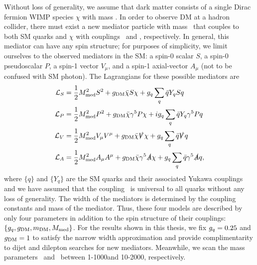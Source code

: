 Without loss of generality, we assume that dark matter consists of a single Dirac fermion WIMP species $\chi$ with mass \mdm. 
In order to observe DM at a hadron collider, there must exist a new mediator particle with mass \mmed\ that couples to both SM quarks and $\chi$ with couplings \gq\ and \gdm, respectively.
In general, this mediator can have any spin structure; for purposes of simplicity, we limit ourselves to the observed mediators in the SM: a spin-0 scalar $S$, a spin-0 pseudoscalar $P$, a spin-1 vector $V_\mu$, and a spin-1 axial-vector $A_\mu$ (not to be confused with SM photon). %
The Lagrangians for these possible mediators are
\begin{align}
  \mathcal{L}_{S} & = \frac{1}{2} M_{\text{med}}^2 S^2 + g_{\text{DM}} \bar \chi S \chi + g_{{q}} \sum\limits_q \bar q Y_q S q \\
  \mathcal{L}_{P} & = \frac{1}{2} M_{\text{med}}^2 P^2 + g_{\text{DM}} \bar \chi \gamma^5 P \chi + i g_{{q}} \sum\limits_q \bar q Y_q \gamma^5 P q \\
  \mathcal{L}_{V} & = \frac{1}{2} M_{\text{med}}^2 V_\mu V^\mu + g_{\text{DM}} \bar \chi \slashed V \chi + g_{{q}} \sum\limits_q \bar q \slashed V q \\
  \mathcal{L}_{A} & = \frac{1}{2} M_{\text{med}}^2 A_\mu A^\mu + g_{\text{DM}} \bar \chi \gamma^5 \slashed A \chi + g_{{q}} \sum\limits_q \bar q \gamma^5 \slashed A q ,
\end{align}
where $\{q\}$ and $\{Y_q\}$ are the SM quarks and their associated Yukawa couplings and we have assumed that the coupling \gq\ is universal to all quarks without any loss of generality.
The width of the mediators is determined by the coupling constants and mass of the mediator.
Thus, these four models are described by only four parameters in addition to the spin structure of their couplings: $\{g_{{q}}, g_{\text{DM}}, m_{\text{DM}}, M_{\text{med}}\}$.
For the results shown in this thesis, we fix $g_{{q}} = 0.25$ and $g_{\text{DM}} = 1$ to satisfy the narrow width approximation and provide complimentarity to dijet and dilepton searches for new mediators.
Meanwhile, we scan the mass parameters \mdm\ and \mmed\ between 1-1000\GeV and 10-2000\GeV, respectively. %

